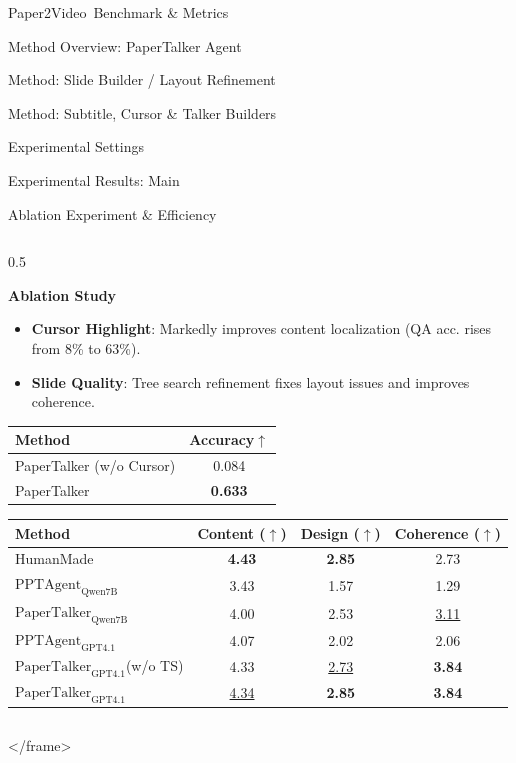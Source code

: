 \documentclass{beamer}
\newcommand{\alertterm}[1]{\alert{\textbf{#1}}}
\newcommand{\bench}{Paper2Video}
\begin{document}
\begin{frame}{\bench~Benchmark \& Metrics}
\begin{frame}{Method Overview: PaperTalker Agent}
\begin{frame}{Method: Slide Builder / Layout Refinement}
\begin{frame}{Method: Subtitle, Cursor \& Talker Builders}
\begin{frame}{Experimental Settings}
\begin{frame}{Experimental Results: Main}
\begin{frame}{Ablation Experiment \& Efficiency}
\begin{columns}[T]
    \begin{column}{0.5\textwidth}
      \begin{block}{\small \alertterm{Ablation Study}}
       \footnotesize
        \small
        \begin{itemize}
          \item \textbf{Cursor Highlight}: Markedly improves content localization (QA acc. rises from 8\% to 63\%).
          \item \textbf{Slide Quality}: Tree search refinement fixes layout issues and improves coherence.
        \end{itemize}
      \end{block}
      \vspace{-0.5\baselineskip}
      \centering
      \tiny
      \label{table:cursor_exp}
      \begin{tabular}{lc}
        \toprule
        Method & Accuracy$\uparrow$ \\
        \midrule
        PaperTalker (w/o Cursor) & 0.084 \\
        PaperTalker & \textbf{0.633} \\
        \bottomrule
      \end{tabular}
      \vspace{0.5\baselineskip}
      \label{tab:slide_quality_exp}
      \begin{tabular}{lccc}
        \toprule
        Method & Content ($\uparrow$) & Design ($\uparrow$) & Coherence ($\uparrow$) \\
        \midrule
        HumanMade & \textbf{4.43} & \textbf{2.85} & 2.73 \\
        \midrule
        $\text{PPTAgent}_\text{Qwen7B}$ & 3.43 & 1.57 & 1.29 \\
        $\text{PaperTalker}_\text{Qwen7B}$ & 4.00 & 2.53 & \underline{3.11} \\
        \midrule
        $\text{PPTAgent}_\text{GPT4.1}$ & 4.07 & 2.02 & 2.06 \\
        $\text{PaperTalker}_\text{GPT4.1}$(w/o TS) & 4.33 & \underline{2.73} & \textbf{3.84} \\
        $\text{PaperTalker}_\text{GPT4.1}$ & \underline{4.34} & \textbf{2.85} & \textbf{3.84} \\
        \bottomrule
      \end{tabular}
    \end{column}
  \end{columns}
</frame>


\end{frame}
\end{frame}
\end{frame}
\end{frame}
\end{frame}
\end{frame}
\end{frame}
\end{document}

